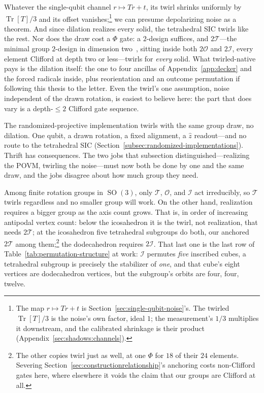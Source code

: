 \documentclass[11pt, oneside, openany]{scrbook}
\DeclareMathOperator{\SO}{SO}
\DeclareMathOperator{\Tr}{Tr}
\newcommand{\Tgroup}{\mathcal{T}}  %
\newcommand{\Ogroup}{\mathcal{O}}  %
\newcommand{\Igroup}{\mathcal{I}}  %
\newcommand{\TwoT}{2\Tgroup}
\newcommand{\TwoO}{2\Ogroup}
\newcommand{\TwoI}{2\Igroup}
\begin{document}
Whatever the single-qubit channel $r \mapsto Tr + t$, its twirl shrinks uniformly by $\Tr[T]/3$ and its offset vanishes;\footnote{The map $r \mapsto Tr + t$ is Section~\ref{sec:single-qubit-noise}'s. The twirled $\Tr[T]/3$ is the noise's own factor, ideal $1$; the measurement's $1/3$ multiplies it downstream, and the calibrated shrinkage is their product (Appendix~\ref{sec:shadows:channels}).} we can presume depolarizing noise as a theorem. And since dilation realizes every solid, the tetrahedral SIC twirls like the rest. Nor does the draw cost a $\Phi$ gate: a $2$-design suffices, and $\TwoT$---the minimal group $2$-design in dimension two~\cite[\S III\,C]{gross2007evenlydistributedunitaries}, sitting inside both $\TwoO$ and $\TwoI$, every element Clifford at depth two or less---twirls for \textit{every} solid. What twirled-native pays is the dilation itself: the one to four ancillas of Appendix~\ref{app:decker} and the forced radicals inside, plus reorientation and an outcome permutation if following this thesis to the letter. Even the twirl's one assumption, noise independent of the drawn rotation, is easiest to believe here: the part that does vary is a depth-$\le 2$ Clifford gate sequence.

The randomized-projective implementation twirls with the same group draw, no dilation. One qubit, a drawn rotation, a fixed alignment, a $\hat z$ readout---and no route to the tetrahedral SIC (Section~\ref{subsec:randomized-implementations}). Thrift has consequences. The two jobs that subsection distinguished---realizing the POVM, twirling the noise---must now both be done by one and the same draw, and the jobs disagree about how much group they need.

Among finite rotation groups in $\SO(3)$, only $\Tgroup$, $\Ogroup$, and $\Igroup$ act irreducibly, so $\Tgroup$ twirls regardless and no smaller group will work. On the other hand, realization requires a bigger group as the axis count grows. That is, in order of increasing antipodal vertex count: below the icosahedron it is the twirl, not realization, that needs $\TwoT$; at the icosahedron five tetrahedral subgroups do both, our anchored $\TwoT$ among them;\footnote{The other copies twirl just as well, at one $\Phi$ for $18$ of their $24$ elements. Severing Section~\ref{sec:constructionrelationship}'s anchoring costs non-Clifford gates here, where elsewhere it voids the claim that our groups are Clifford at all.} the dodecahedron requires $\TwoI$. That last one is the last row of Table~\ref{tab:permutation-structure} at work: $\Igroup$ permutes \textit{five} inscribed cubes, a tetrahedral subgroup is precisely the stabilizer of \textit{one}, and that cube's eight vertices are dodecahedron vertices, but the subgroup's orbits are four, four, twelve.
\end{document}
